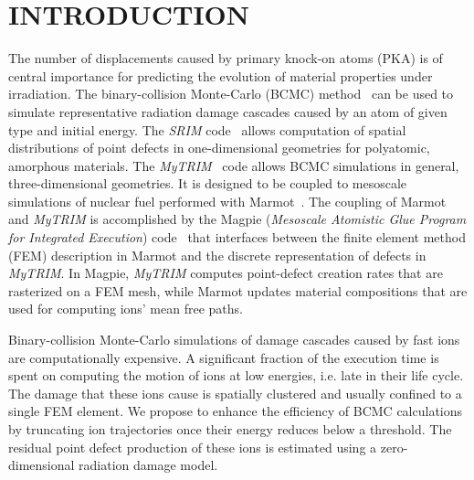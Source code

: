 \documentclass[letterpaper]{mandc2019}
\begin{document}
\section{INTRODUCTION} 
The number of displacements caused by primary knock-on atoms (PKA) is of central importance for predicting the evolution of material properties under irradiation. The binary-collision Monte-Carlo (BCMC) method~\cite{SRIM} can be used to simulate representative radiation damage cascades caused by an atom of given type and initial energy. The \textit{SRIM} code~\cite{SRIM} allows computation of spatial distributions of point defects in one-dimensional geometries for polyatomic, amorphous materials. 
The \textit{MyTRIM}~\cite{Schwen2010} code allows BCMC simulations in general, three-dimensional geometries. It is designed to be coupled to mesoscale simulations of nuclear fuel performed with Marmot~\cite{TONKS201220,SCHWEN201736}. The coupling of Marmot and \textit{MyTRIM} is accomplished by the Magpie (\textit{Mesoscale Atomistic Glue Program for Integrated Execution}) code~\cite{Zabriskie2019} that interfaces between the finite element method (FEM) description in Marmot and the discrete representation of defects in \textit{MyTRIM}. 
In Magpie, \textit{MyTRIM} computes point-defect creation rates that are rasterized on a FEM mesh, while Marmot updates material compositions that are used for computing ions' mean free paths.

Binary-collision Monte-Carlo simulations of damage cascades caused by fast ions are computationally expensive. A significant fraction of the execution time is spent on computing the motion of ions at low energies, i.e. late in their life cycle. The damage that these ions cause is spatially clustered and usually confined to a single FEM element. We propose to enhance the efficiency of  BCMC calculations by truncating ion trajectories once their energy reduces below a threshold. The residual point defect production of these ions is estimated using a zero-dimensional radiation damage model.

\end{document}

